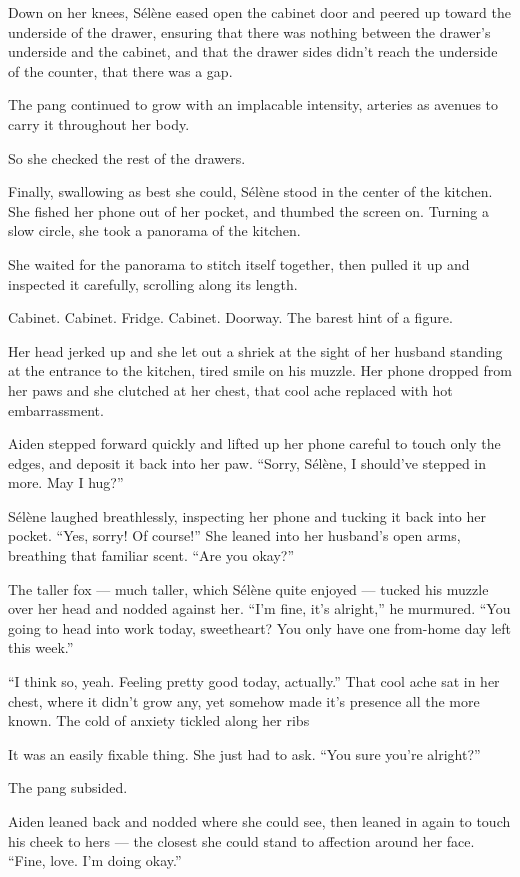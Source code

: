 Down on her knees, Sélène eased open the cabinet door and peered up toward the underside of the drawer, ensuring that there was nothing between the drawer's underside and the cabinet, and that the drawer sides didn't reach the underside of the counter, that there was a gap.

The pang continued to grow with an implacable intensity, arteries as avenues to carry it throughout her body.

So she checked the rest of the drawers.

Finally, swallowing as best she could, Sélène stood in the center of the kitchen. She fished her phone out of her pocket, and thumbed the screen on. Turning a slow circle, she took a panorama of the kitchen.

She waited for the panorama to stitch itself together, then pulled it up and inspected it carefully, scrolling along its length.

Cabinet. Cabinet. Fridge. Cabinet. Doorway. The barest hint of a figure.

Her head jerked up and she let out a shriek at the sight of her husband standing at the entrance to the kitchen, tired smile on his muzzle. Her phone dropped from her paws and she clutched at her chest, that cool ache replaced with hot embarrassment.

Aiden stepped forward quickly and lifted up her phone careful to touch only the edges, and deposit it back into her paw. ``Sorry, Sélène, I should've stepped in more. May I hug?''

Sélène laughed breathlessly, inspecting her phone and tucking it back into her pocket. ``Yes, sorry! Of course!'' She leaned into her husband's open arms, breathing that familiar scent. ``Are you okay?''

The taller fox --- much taller, which Sélène quite enjoyed --- tucked his muzzle over her head and nodded against her. ``I'm fine, it's alright,'' he murmured. ``You going to head into work today, sweetheart? You only have one from-home day left this week.''

``I think so, yeah. Feeling pretty good today, actually.'' That cool ache sat in her chest, where it didn't grow any, yet somehow made it's presence all the more known. The cold of anxiety tickled along her ribs

It was an easily fixable thing. She just had to ask. ``You sure you're alright?''

The pang subsided.

Aiden leaned back and nodded where she could see, then leaned in again to touch his cheek to hers --- the closest she could stand to affection around her face. ``Fine, love. I'm doing okay.''

